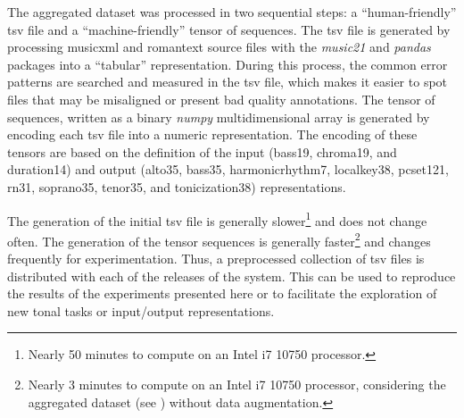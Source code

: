 
The aggregated dataset was processed in two sequential
steps: a ``human-friendly'' \gls{tsv} file and a
``machine-friendly'' tensor of sequences. The \gls{tsv} file
is generated by processing \gls{musicxml} and
\gls{romantext} source files with the \emph{music21}
\parencite{cuthbert2010music21} and \emph{pandas}
\parencite{mckinney2011pandas} packages into a ``tabular''
representation. During this process, the common error
patterns are searched and measured in the \gls{tsv} file,
which makes it easier to spot files that may be misaligned
or present bad quality annotations. The tensor of sequences,
written as a binary \emph{numpy}
\parencite{oliphant2006guide} multidimensional array is
generated by encoding each \gls{tsv} file into a numeric
representation. The encoding of these tensors are based on
the definition of the input (\gls{bass19}, \gls{chroma19},
and \gls{duration14}) and output (\gls{alto35},
\gls{bass35}, \gls{harmonicrhythm7}, \gls{localkey38},
\gls{pcset121}, \gls{rn31}, \gls{soprano35}, \gls{tenor35},
and \gls{tonicization38}) representations.

The generation of the initial \gls{tsv} file is generally
slower\footnote{Nearly 50 minutes to compute on an Intel i7
10750 processor.} and does not change often. The generation
of the tensor sequences is generally faster\footnote{Nearly
3 minutes to compute on an Intel i7 10750 processor,
considering the aggregated dataset (see
) without data augmentation.}
and changes frequently for experimentation. Thus, a
preprocessed collection of \gls{tsv} files is distributed
with each of the releases of the system. This can be used to
reproduce the results of the experiments presented here or
to facilitate the exploration of new tonal tasks or
input/output representations.
